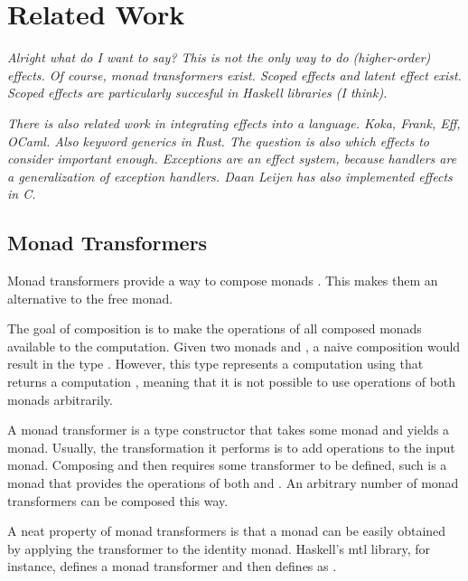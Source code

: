 \chapter{Related Work}\label{chap:related_work}



\emph{Alright what do I want to say? This is not the only way to do (higher-order) effects. Of course, monad transformers exist. Scoped effects and latent effect exist. Scoped effects are particularly succesful in Haskell libraries (I think).}

\emph{There is also related work in integrating effects into a language. Koka, Frank, Eff, OCaml. Also keyword generics in Rust. The question is also \emph{which} effects to consider important enough. Exceptions are an effect system, because handlers are a generalization of exception handlers. Daan Leijen has also implemented effects in C.}

\section{Monad Transformers}\label{sec:monad_transformers}

Monad transformers provide a way to compose monads \autocite{moggi_abstract_1989}. This makes them an alternative to the free monad.

The goal of composition is to make the operations of all composed monads available to the computation. Given two monads  and , a naive composition would result in the type . However, this type represents a computation using  that returns a computation , meaning that it is not possible to use operations of both monads arbitrarily.

A monad transformer is a type constructor that takes some monad and yields a monad. Usually, the transformation it performs is to add operations to the input monad. Composing  and  then requires some transformer  to be defined, such  is a monad that provides the operations of both  and . An arbitrary number of monad transformers can be composed this way.

A neat property of monad transformers is that a monad can be easily obtained by applying the transformer to the identity monad. Haskell's mtl library, for instance, defines a monad transformer  and then defines  as .

